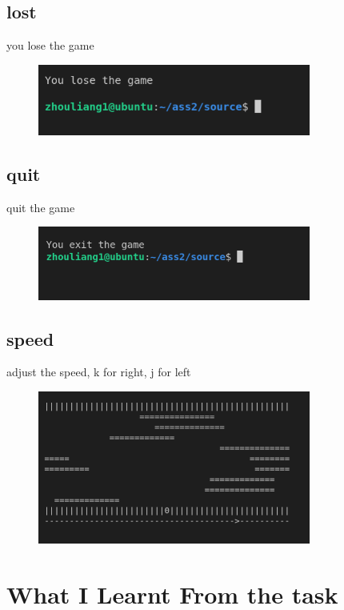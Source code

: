 \documentclass{article}
\begin{document}
\subsection{lost}
you lose the game
\begin{figure}[htbp]
    \centering
    \includegraphics[width = 0.8\textwidth]{lose.png}
\end{figure}

\subsection{quit}
quit the game
\begin{figure}[htbp]
    \centering
    \includegraphics[width = 0.8\textwidth]{quit.png}
\end{figure}

\subsection{speed}
adjust the speed, k for right, j for left
\begin{figure}[htbp]
    \centering
    \includegraphics[width = 0.8\textwidth]{quick.png}
\end{figure}

\section{What I Learnt From the task}
\end{document}

